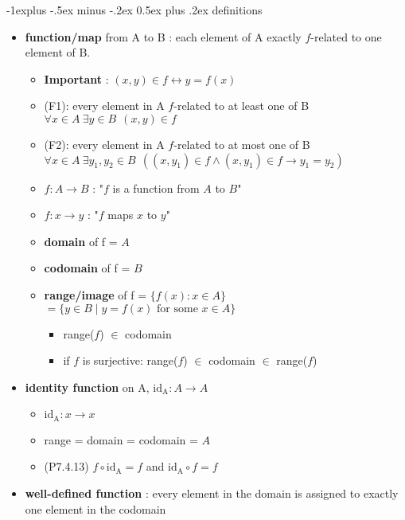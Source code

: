 \documentclass[10pt, landscape]{article}
\makeatletter
\renewcommand{\subsection}{\@startsection{subsection}{2}{0mm}%
                                {-1explus -.5ex minus -.2ex}%
                                {0.5ex plus .2ex}%
                                {\normalfont\normalsize\bfseries}}
\renewcommand{\bf}[1]{\textbf{#1}}
\let\iff\leftrightarrow
\let\then\rightarrow
\makeatother
\begin{document}
\begin{multicols}{4}
\subsection{definitions}
\begin{itemize}
    \item \bf{function/map} from A to B : each element of A exactly $f$-related to one element of B.
        \begin{itemize}
            \item \bf{Important} : $(x,y) \in f \iff y = f(x)$
            \item (F1): every element in A $f$-related to at least one of B
            $ \forall x \in A \: \exists y \in B \:\: (x,y) \in f$
            \item (F2): every element in A $f$-related to at most one of B
            $ \forall x \in A \: \exists y_1,y_2 \in B \:\: ((x,y_1) \in f \land (x,y_1) \in f \then y_1 = y_2)$
            \item $f:A \to B$ : "$f$ is a function from $A$ to $B$"
            \item $f:x \to y$ : "$f$ maps $x$ to $y$"
            \item \bf{domain} of f = $A$
            \item \bf{codomain} of f = $B$
            \item \bf{range/image} of f = $\{f(x) : x \in A\} $ 
                \\$= \{y \in B \mid y= f(x) \text{ for some } x \in A \}$
                \begin{itemize}
                    \item range($f$) $\in$ codomain
                    \item if $f$ is surjective: range($f$) $\in$ codomain $\in$ range($f$)
                \end{itemize}
        \end{itemize}
    \item \bf{identity function} on A, $\text{id}_\text{A} : A \to A$ 
        \begin{itemize}
            \item $\text{id}_\text{A} : x \to x$ 
            \item range = domain = codomain = $A$
            \item (P7.4.13) $f \circ \text{id}_\text{A} = f$ and $\text{id}_\text{A} \circ f = f$
        \end{itemize}
        \item \bf{well-defined function} : every element in the domain is assigned to exactly one element in the codomain
\end{itemize}

\end{multicols}
\end{document}

